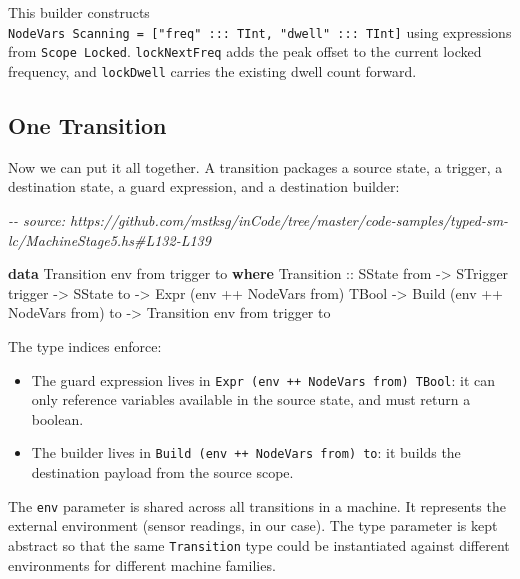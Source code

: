 \documentclass[]{article}
\newenvironment{Shaded}{}{}
\newcommand{\CommentTok}[1]{\textcolor[rgb]{0.38,0.63,0.69}{\textit{#1}}}
\newcommand{\DataTypeTok}[1]{\textcolor[rgb]{0.56,0.13,0.00}{#1}}
\newcommand{\KeywordTok}[1]{\textcolor[rgb]{0.00,0.44,0.13}{\textbf{#1}}}
\newcommand{\NormalTok}[1]{#1}
\newcommand{\OperatorTok}[1]{\textcolor[rgb]{0.40,0.40,0.40}{#1}}
\newcommand{\OtherTok}[1]{\textcolor[rgb]{0.00,0.44,0.13}{#1}}
\begin{document}
This builder constructs
\texttt{NodeVars\ Scanning\ =\ {[}"freq"\ :::\ TInt,\ "dwell"\ :::\ TInt{]}}
using expressions from \texttt{Scope\ Locked}. \texttt{lockNextFreq} adds the
peak offset to the current locked frequency, and \texttt{lockDwell} carries the
existing dwell count forward.

\subsection{One Transition}\label{one-transition}

Now we can put it all together. A transition packages a source state, a trigger,
a destination state, a guard expression, and a destination builder:

\begin{Shaded}
\begin{Highlighting}[]
\CommentTok{{-}{-} source: https://github.com/mstksg/inCode/tree/master/code{-}samples/typed{-}sm{-}lc/MachineStage5.hs\#L132{-}L139}

\KeywordTok{data} \DataTypeTok{Transition}\NormalTok{ env from trigger to }\KeywordTok{where}
  \DataTypeTok{Transition} \OtherTok{::}
    \DataTypeTok{SState}\NormalTok{ from }\OtherTok{{-}\textgreater{}}
    \DataTypeTok{STrigger}\NormalTok{ trigger }\OtherTok{{-}\textgreater{}}
    \DataTypeTok{SState}\NormalTok{ to }\OtherTok{{-}\textgreater{}}
    \DataTypeTok{Expr}\NormalTok{ (env }\OperatorTok{++} \DataTypeTok{NodeVars}\NormalTok{ from) }\DataTypeTok{TBool} \OtherTok{{-}\textgreater{}}
    \DataTypeTok{Build}\NormalTok{ (env }\OperatorTok{++} \DataTypeTok{NodeVars}\NormalTok{ from) to }\OtherTok{{-}\textgreater{}}
    \DataTypeTok{Transition}\NormalTok{ env from trigger to}
\end{Highlighting}
\end{Shaded}

The type indices enforce:

\begin{itemize}
\tightlist
\item
  The guard expression lives in \texttt{Expr\ (env\ ++\ NodeVars\ from)\ TBool}:
  it can only reference variables available in the source state, and must return
  a boolean.
\item
  The builder lives in \texttt{Build\ (env\ ++\ NodeVars\ from)\ to}: it builds
  the destination payload from the source scope.
\end{itemize}

The \texttt{env} parameter is shared across all transitions in a machine. It
represents the external environment (sensor readings, in our case). The type
parameter is kept abstract so that the same \texttt{Transition} type could be
instantiated against different environments for different machine families.
\end{document}
